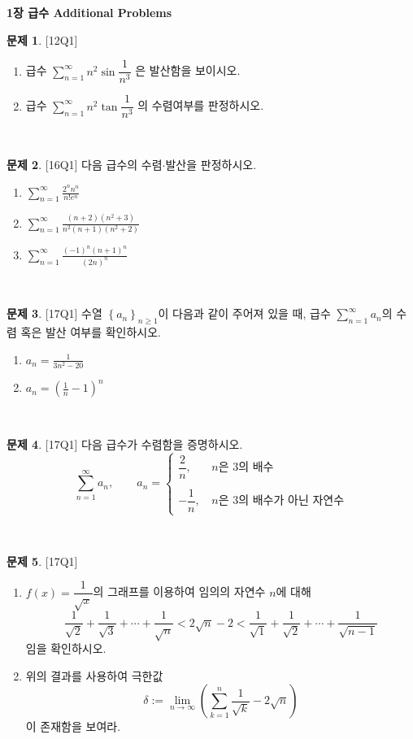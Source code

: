 \documentclass[12pt]{article}
\newcommand{\ds}{\displaystyle}
\theoremstyle{definition}
\newtheorem{problem}{\sffamily 문제}[section]
\newcommand{\prob}[2]{\begin{problem}{[\sffamily #1]} #2\end{problem}~}
\begin{document}
\begin{center}
\textbf{\Large 1장 급수 Additional Problems}
\end{center}

\prob{12Q1}{
\begin{enumerate}
	\item 급수 $\ds \sum_{n=1}^\infty n^2 \sin \dfrac{1}{n^3}$ 은 발산함을 보이시오.
	\item 급수 $\ds \sum_{n=1}^\infty n^2\tan\dfrac{1}{n^3}$ 의 수렴여부를 판정하시오.
\end{enumerate}
}

\prob{16Q1}{다음 급수의 수렴$\cdot$발산을 판정하시오.
\begin{enumerate}
	\item $\ds \sum_{n=1}^\infty \frac{2^nn^n}{n!e^n}$
	\item $\ds \sum_{n=1}^\infty \frac{(n+2)(n^2+3)}{n^2(n+1)(n^2+2)}$
	\item $\ds \sum_{n=1}^\infty \frac{(-1)^n (n+1)^n}{(2n)^n}$
\end{enumerate}
}

\prob{17Q1}{수열 $\left\{ a_n \right\} _{n \geq 1}$이 다음과 같이 주어져 있을 때, 급수 $\displaystyle\sum\limits_{n=1}^{\infty}a_n$의 수렴 혹은 발산 여부를 확인하시오.
\begin{enumerate}
	\item $\displaystyle a_n=\frac{1}{3n^2-20}$
	\item $\displaystyle a_n=\left(\frac{1}{n} - 1\right) ^n$
\end{enumerate}
}

\prob{17Q1}{다음 급수가 수렴함을 증명하시오.
\begin{equation*}
	\sum_{n=1}^{\infty}a_n, \qquad a_n=\left\{
	\begin{array}{rl}
	\dfrac{2}{n}, &\, n\text{은 }  3\text{의 배수}\\ \\
	-\dfrac{1}{n}, &\, n\text{은 } 3\text{의 배수가 아닌 자연수}
	\end{array}
	\right.
\end{equation*}
}

\prob{17Q1}{
\begin{enumerate}
	\item $f(x)=\dfrac{1}{\sqrt{x}}$의 그래프를 이용하여 임의의 자연수 $n$에 대해
	$$\frac{1}{\sqrt{2}}+\frac{1}{\sqrt{3}}+\cdots+\frac{1}{\sqrt{n}}<2\sqrt{n}-2<\frac{1}{\sqrt{1}}+\frac{1}{\sqrt{2}}+\cdots+\frac{1}{\sqrt{n-1}}$$
	임을 확인하시오.
	\item  위의 결과를 사용하여 극한값
	$$\delta := \lim_{n \rightarrow \infty} \left(\sum_{k=1}^n \frac{1}{\sqrt{k}}-2\sqrt{n}\right)$$
	이 존재함을 보여라.
\end{enumerate}
}
\end{document}
